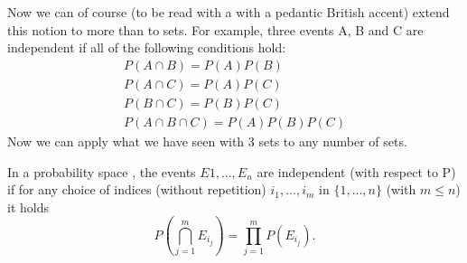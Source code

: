 Now we can of course (to be read with a with a pedantic British accent) extend this notion to more than to sets. For example, three events A, B and C are independent if all of the following conditions hold:
\begin{equation*}
    \begin{gathered}
        P(A \cap B) = P(A)P(B)\\
        P(A \cap C) = P(A)P(C)\\
        P(B \cap C) = P(B)P(C)\\
        P(A \cap B \cap C) = P(A)P(B)P(C)
    \end{gathered}
\end{equation*}
Now we can apply what we have seen with 3 sets to any number of sets.
\begin{definition}
    In a probability space \probspace, the events $E1,...,E_n$ are independent (with respect to P) if for any choice of indices (without repetition) $i_1,...,i_m$ in $\{1,...,n\}$ (with $m \le n$) it holds
    \begin{equation*}
        P\left(\bigcap_{j=1}^mE_{i_j}\right) = \prod_{j=1}^mP(E_{i_j}).
    \end{equation*}
\end{definition}
